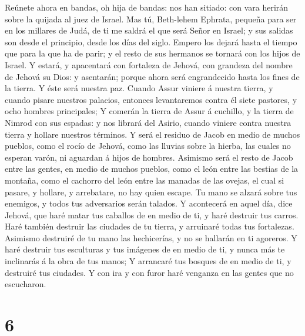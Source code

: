  Reúnete ahora en bandas, oh hija de bandas: nos han
sitiado: con vara herirán sobre la quijada al juez de Israel.
 Mas tú, Beth-lehem Ephrata, pequeña para ser en los
millares de Judá, de ti me saldrá el que será Señor en Israel; y sus
salidas son desde el principio, desde los días del siglo. 
Empero los dejará hasta el tiempo que para la que ha de parir; y el
resto de sus hermanos se tornará con los hijos de Israel. 
Y estará, y apacentará con fortaleza de Jehová, con grandeza del nombre
de Jehová su Dios: y asentarán; porque ahora será engrandecido hasta los
fines de la tierra.  Y éste será nuestra paz. Cuando Assur
viniere á nuestra tierra, y cuando pisare nuestros palacios, entonces
levantaremos contra él siete pastores, y ocho hombres principales;
 Y comerán la tierra de Assur á cuchillo, y la tierra de
Nimrod con sus espadas: y nos librará del Asirio, cuando viniere contra
nuestra tierra y hollare nuestros términos.  Y será el
residuo de Jacob en medio de muchos pueblos, como el rocío de Jehová,
como las lluvias sobre la hierba, las cuales no esperan varón, ni
aguardan á hijos de hombres.  Asimismo será el resto de
Jacob entre las gentes, en medio de muchos pueblos, como el león entre
las bestias de la montaña, como el cachorro del león entre las manadas
de las ovejas, el cual si pasare, y hollare, y arrebatare, no hay quien
escape.  Tu mano se alzará sobre tus enemigos, y todos tus
adversarios serán talados.  Y acontecerá en aquel día,
dice Jehová, que haré matar tus caballos de en medio de ti, y haré
destruir tus carros.  Haré también destruir las ciudades
de tu tierra, y arruinaré todas tus fortalezas.  Asimismo
destruiré de tu mano las hechicerías, y no se hallarán en ti agoreros.
 Y haré destruir tus esculturas y tus imágenes de en
medio de ti, y nunca más te inclinarás á la obra de tus manos;
 Y arrancaré tus bosques de en medio de ti, y destruiré
tus ciudades.  Y con ira y con furor haré venganza en las
gentes que no escucharon.

\hypertarget{section-5}{%
\section{6}\label{section-5}}

